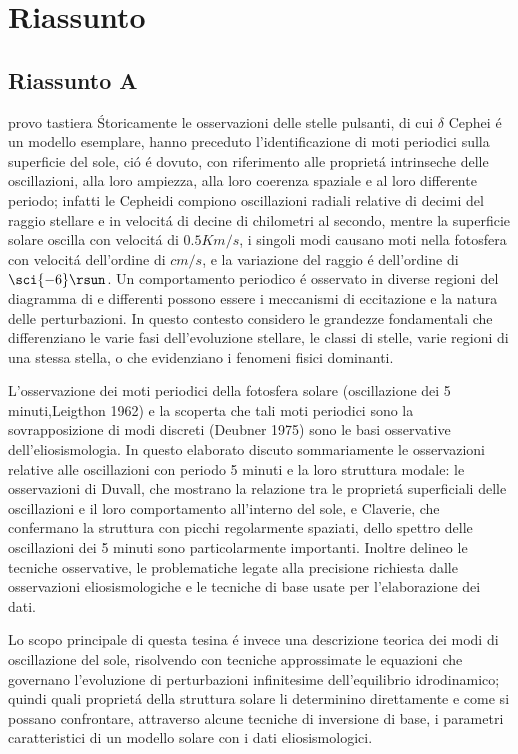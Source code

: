 \chapter{Riassunto}
\PartialToc

\section{Riassunto A}
provo tastiera \'
Storicamente le osservazioni delle stelle pulsanti, di cui $\delta$ Cephei \'e un modello esemplare, hanno preceduto l'identificazione di moti periodici sulla superficie del sole, ci\'o \'e dovuto, con riferimento alle propriet\'a intrinseche delle oscillazioni, alla loro ampiezza, alla loro coerenza spaziale e al loro differente periodo; infatti le Cepheidi compiono oscillazioni radiali relative di decimi del raggio stellare e in velocit\'a di decine di chilometri al secondo, mentre la superficie solare oscilla con velocit\'a di $0.5 Km/s$, i singoli modi causano moti nella fotosfera con velocit\'a dell'ordine di $cm/s$, e la variazione del raggio \'e dell'ordine di $\sci{-6}\rsun$. Un comportamento periodico \'e osservato in diverse regioni del diagramma di \hr{} e differenti possono essere i meccanismi di eccitazione e la natura delle perturbazioni. In questo contesto considero le grandezze fondamentali che differenziano le varie fasi dell'evoluzione stellare, le classi di stelle, varie regioni di una stessa stella, o che evidenziano i fenomeni fisici dominanti.

L'osservazione dei moti periodici della fotosfera solare (oscillazione dei 5 minuti,Leigthon 1962) e la scoperta che tali moti periodici sono la sovrapposizione di modi discreti (Deubner 1975) sono le basi osservative dell'eliosismologia. In questo elaborato discuto sommariamente le osservazioni relative  alle oscillazioni con periodo 5 minuti e la loro struttura modale: le osservazioni di Duvall, che mostrano la relazione tra le propriet\'a superficiali delle oscillazioni e il loro comportamento all'interno del sole, e Claverie, che confermano la struttura con picchi regolarmente spaziati, dello spettro delle oscillazioni dei 5 minuti sono particolarmente importanti. Inoltre delineo le tecniche osservative, le problematiche legate alla precisione richiesta dalle osservazioni eliosismologiche e le tecniche di base usate per l'elaborazione dei dati.

Lo scopo principale di questa tesina \'e invece una descrizione teorica dei modi di oscillazione del sole, risolvendo con tecniche approssimate le equazioni che governano l'evoluzione di perturbazioni infinitesime dell'equilibrio idrodinamico; quindi quali propriet\'a della struttura solare li determinino direttamente e come si possano confrontare, attraverso alcune tecniche di inversione di base, i parametri caratteristici di un modello solare con i dati eliosismologici.


